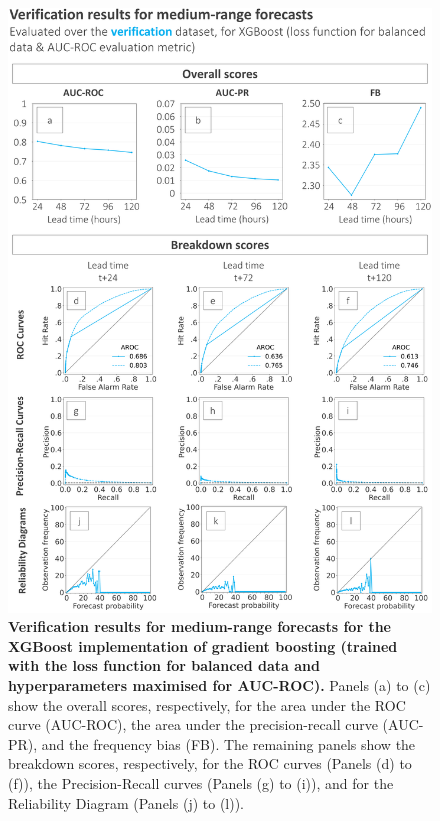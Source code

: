 \begin{figure}[htbp]
\centering
\includegraphics[width=\textwidth]{verif_long_fc.png}
\caption{\textbf{Verification results for medium-range forecasts for the XGBoost implementation of gradient boosting (trained with the loss function for balanced data and hyperparameters maximised for AUC-ROC).} Panels (a) to (c) show the overall scores, respectively, for the area under the ROC curve (AUC-ROC), the area under the precision-recall curve (AUC-PR), and the frequency bias (FB). The remaining panels show the breakdown scores, respectively, for the ROC curves (Panels (d) to (f)), the Precision-Recall curves (Panels (g) to (i)), and for the Reliability Diagram (Panels (j) to (l)).}
\label{fig:verif_long_fc}
\end{figure}


